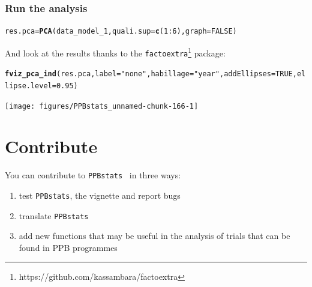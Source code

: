 \documentclass{article}\usepackage[]{graphicx}\usepackage[]{color}
\makeatletter
\newcommand{\hlnum}[1]{\textcolor[rgb]{0.686,0.059,0.569}{#1}}%
\newcommand{\hlstr}[1]{\textcolor[rgb]{0.192,0.494,0.8}{#1}}%
\newcommand{\hlopt}[1]{\textcolor[rgb]{0,0,0}{#1}}%
\newcommand{\hlstd}[1]{\textcolor[rgb]{0.345,0.345,0.345}{#1}}%
\newcommand{\hlkwb}[1]{\textcolor[rgb]{0.69,0.353,0.396}{#1}}%
\newcommand{\hlkwc}[1]{\textcolor[rgb]{0.333,0.667,0.333}{#1}}%
\newcommand{\hlkwd}[1]{\textcolor[rgb]{0.737,0.353,0.396}{\textbf{#1}}}%
\newenvironment{kframe}{%
 \def\at@end@of@kframe{}%
 \ifinner\ifhmode%
  \def\at@end@of@kframe{\end{minipage}}%
  \begin{minipage}{\columnwidth}%
 \fi\fi%
 \def\FrameCommand##1{\hskip\@totalleftmargin \hskip-\fboxsep
 \colorbox{shadecolor}{##1}\hskip-\fboxsep
     \hskip-\linewidth \hskip-\@totalleftmargin \hskip\columnwidth}%
 \MakeFramed {\advance\hsize-\width
   \@totalleftmargin\z@ \linewidth\hsize
   \@setminipage}}%
 {\par\unskip\endMakeFramed%
 \at@end@of@kframe}
\newenvironment{knitrout}{}{} %
\newcommand{\pack}{\texttt{PPBstats}}
\makeatother
\begin{document}
\subsubsection{Run the analysis}


\begin{knitrout}
\color{fgcolor}\begin{kframe}
\begin{alltt}
\hlstd{res.pca} \hlkwb{=} \hlkwd{PCA}\hlstd{(data_model_1,} \hlkwc{quali.sup} \hlstd{=} \hlkwd{c}\hlstd{(}\hlnum{1}\hlopt{:}\hlnum{6}\hlstd{),} \hlkwc{graph} \hlstd{=} \hlnum{FALSE}\hlstd{)}
\end{alltt}
\end{kframe}
\end{knitrout}

And look at the results thanks to the \texttt{factoextra}\footnote{https://github.com/kassambara/factoextra} package:

\begin{knitrout}
\color{fgcolor}\begin{kframe}
\begin{alltt}
\hlkwd{fviz_pca_ind}\hlstd{(res.pca,} \hlkwc{label}\hlstd{=}\hlstr{"none"}\hlstd{,} \hlkwc{habillage}\hlstd{=}\hlstr{"year"}\hlstd{,} \hlkwc{addEllipses}\hlstd{=}\hlnum{TRUE}\hlstd{,} \hlkwc{ellipse.level}\hlstd{=}\hlnum{0.95}\hlstd{)}
\end{alltt}
\end{kframe}

{\centering \texttt{[image: figures/PPBstats\_unnamed-chunk-166-1]} 

}



\end{knitrout}

\newpage


\section{Contribute}
\label{contribute}

You can contribute to \pack~ in three ways:

\begin{enumerate}
\item test \pack, the vignette and report bugs
\item translate \pack
\item add new functions that may be useful in the analysis of trials that can be found in PPB programmes
\end{enumerate}
\end{document}
